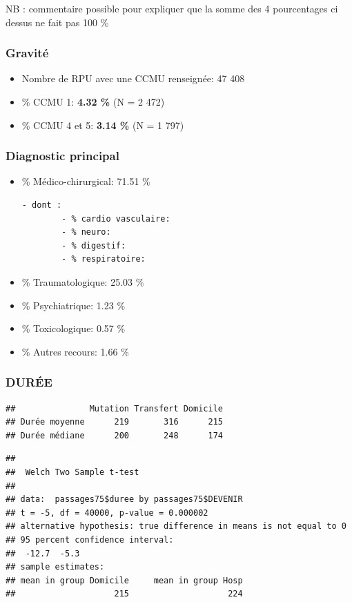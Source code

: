 \documentclass[]{article}
\begin{document}
NB : commentaire possible pour expliquer que la somme des 4 pourcentages
ci dessus ne fait pas 100 \%

\subsubsection{Gravité}\label{gravite}

\begin{itemize}
\itemsep1pt\parskip0pt
\item
  Nombre de RPU avec une CCMU renseignée: 47 408
\item
  \% CCMU 1: \textbf{4.32 \%} (N = 2 472)
\item
  \% CCMU 4 et 5: \textbf{3.14 \%} (N = 1 797)
\end{itemize}

\subsubsection{Diagnostic principal}\label{diagnostic-principal-1}

\begin{itemize}
\item
  \% Médico-chirurgical: 71.51 \%

\begin{verbatim}
- dont :
        - % cardio vasculaire:
        - % neuro:
        - % digestif:
        - % respiratoire:
\end{verbatim}
\item
  \% Traumatologique: 25.03 \%
\item
  \% Psychiatrique: 1.23 \%
\item
  \% Toxicologique: 0.57 \%
\item
  \% Autres recours: 1.66 \%
\end{itemize}

\subsubsection{DURÉE}\label{duree}

\begin{verbatim}
##               Mutation Transfert Domicile
## Durée moyenne      219       316      215
## Durée médiane      200       248      174
\end{verbatim}

\begin{verbatim}
## 
##  Welch Two Sample t-test
## 
## data:  passages75$duree by passages75$DEVENIR
## t = -5, df = 40000, p-value = 0.000002
## alternative hypothesis: true difference in means is not equal to 0
## 95 percent confidence interval:
##  -12.7  -5.3
## sample estimates:
## mean in group Domicile     mean in group Hosp 
##                    215                    224
\end{verbatim}
\end{document}
